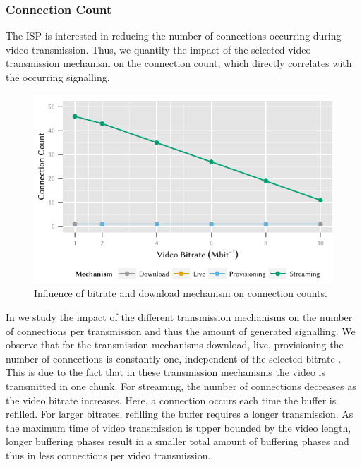 \subsubsection*{Connection Count}\label{sec:application:lte_video:connection_count}
The \gls{ISP} is interested in reducing the number of connections occurring during video transmission.
Thus, we quantify the impact of the selected video transmission mechanism on the connection count, which directly correlates with the occurring signalling.

\begin{figure}
  \centering
  \includegraphics{application/lte_video/numerical_evaluation/figures/bitrate2connections}
  \caption{Influence of bitrate and download mechanism on connection counts.}
  \label{fig:application:lte_video:numerical_evaluation:energy_consumption:bitrate2connections}
\end{figure}

In  we study the impact of the different transmission mechanisms on the number of connections per transmission and thus the amount of generated signalling.
We observe that for the transmission mechanisms download, live, provisioning the number of connections is constantly one, independent of the selected bitrate \bitrate.
This is due to the fact that in these transmission mechanisms the video is transmitted in one chunk.
For streaming, the number of connections decreases as the video bitrate increases.
Here, a connection occurs each time the buffer is refilled.
For larger bitrates, refilling the buffer requires a longer transmission.
As the maximum time of video transmission is upper bounded by the video length, longer buffering phases result in a smaller total amount of buffering phases and thus in less connections per video transmission.

